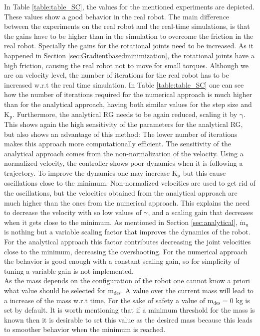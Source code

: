 In Table \ref{table:table_SC}, the values for the mentioned experiments are depicted. These values show a good behavior in the real robot. The main difference between the experiments on the real robot and the real-time simulations, is that the gains have to be higher than in the simulation to overcome the friction in the real robot. Specially the gains for the rotational joints need to be increased. As it happened in Section \ref{sec:Gradientbasedminimization}, the rotational joints have a high friction, causing the real robot not to move for small torques. Although we are on velocity level, the number of iterations for the real robot has to be increased w.r.t the real time simulation. 
 In Table \ref{table:table_SC} one can see how the number of iterations required for the numerical approach is much higher than for the analytical approach, having both similar values for the step size and $\mathrm{K_p}$. Furthermore, the analytical RG needs to be again  reduced, scaling it by $\mathrm{\gamma}$. This shows again the high sensitivity of the parameters for the analytical RG, but also shows an advantage of this method: The lower number of iterations makes this approach more computationally efficient. The sensitivity of the analytical approach comes from the non-normalization of the velocity. Using a normalized velocity, the controller shows poor dynamics when it is following a trajectory. To improve the dynamics one may increase $\mathrm{K_p}$ but this cause oscillations close to the minimum. Non-normalized velocities are used to get rid of the oscillations, but the velocities obtained from the analytical approach are much higher than the ones from the numerical approach. This explains the need to decrease the velocity with so low values of $\mathrm{\gamma}$, and a scaling gain that decreases when it gets close to the minimum.
As mentioned in Section \ref{sec:analytical},  $\mathrm{\dot{m}_u}$ is nothing but a variable scaling factor that improves the dynamics of the robot. For the analytical approach this factor contributes decreasing the joint velocities close to the minimum, decreasing the overshooting.
For the numerical approach the behavior is good enough with a constant scaling gain, so for simplicity of tuning a variable gain is not implemented.  \\
As the mass depends on the  configuration of the robot one cannot know a priori what value should be selected for $\mathrm{m_{des}}$. A value over the current mass will lead to a increase of the mass w.r.t time. 
For the sake of safety a value of $\mathrm{m_{des}=0}$ kg is set by default. It is worth mentioning that if a minimum threshold for the mass is known then it is desirable to set this value as the desired mass because this leads to smoother behavior when the minimum is reached.





